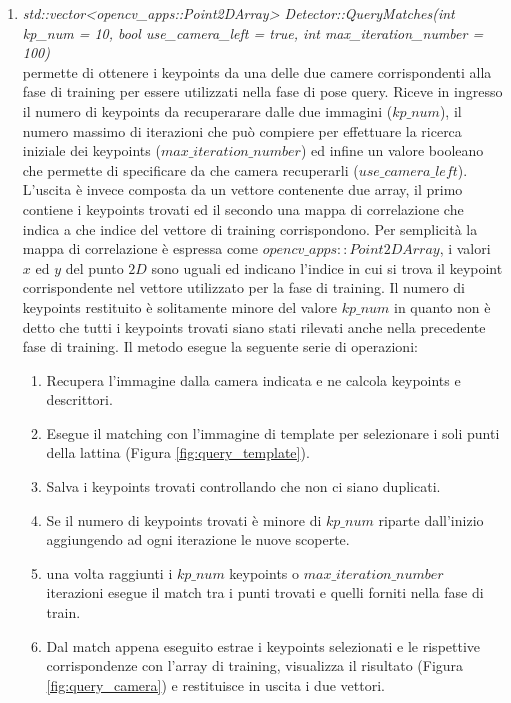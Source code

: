 \documentclass[english]{article}
\begin{document}
\begin{enumerate}
\item \textit{std::vector<opencv\_apps::Point2DArray> Detector::QueryMatches(int kp\_num = 10, bool use\_camera\_left = true, int max\_iteration\_number = 100)} 
\\ permette di ottenere i keypoints da una delle due camere corrispondenti alla fase di training per essere utilizzati nella fase di pose query. Riceve in ingresso il numero di keypoints da recuperarare dalle due immagini ($kp\_num$), il numero massimo di iterazioni che può compiere per effettuare la ricerca iniziale dei keypoints ($max\_iteration\_number$) ed infine un valore booleano che permette di specificare da che camera recuperarli ($use\_camera\_left$). L'uscita è invece composta da un vettore contenente due array, il primo contiene i keypoints trovati ed il secondo una mappa di correlazione che indica a che indice del vettore di training corrispondono. Per semplicità la mappa di correlazione è espressa come $opencv\_apps::Point2DArray$, i valori $x$ ed $y$ del punto $2D$ sono uguali ed indicano l'indice in cui si trova il keypoint corrispondente nel vettore utilizzato per la fase di training. Il numero di keypoints restituito è solitamente minore del valore $kp\_num$ in quanto non è detto che tutti i keypoints trovati siano stati rilevati anche nella precedente fase di training. Il metodo esegue la seguente serie di operazioni:
	\begin{enumerate}
	\item Recupera l'immagine dalla camera indicata e ne calcola keypoints e descrittori.
	\item Esegue il matching con l'immagine di template per selezionare i soli punti della lattina (Figura \ref{fig:query_template}).
	\item Salva i keypoints trovati controllando che non ci siano duplicati.
	\item Se il numero di keypoints trovati è minore di $kp\_num$ riparte dall'inizio aggiungendo ad ogni iterazione le nuove scoperte.
	\item una volta raggiunti i $kp\_num$ keypoints o $max\_iteration\_number$ iterazioni esegue il match tra i punti trovati e quelli forniti nella fase di train.
	\item Dal match appena eseguito estrae i keypoints selezionati e le rispettive corrispondenze con l'array di training, visualizza il risultato (Figura \ref{fig:query_camera}) e restituisce in uscita i due vettori.	
	\end{enumerate}
\end{enumerate}
\end{document}
